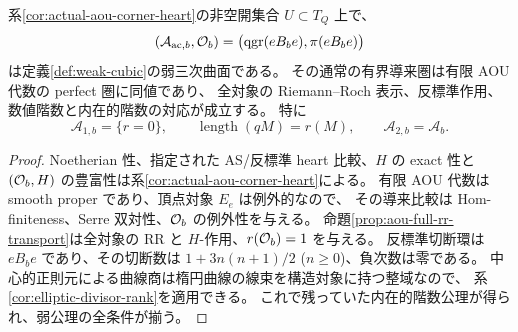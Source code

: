 \begin{corollary}
\label{cor:actual-aou-weak-heart}
系\ref{cor:actual-aou-corner-heart}の非空開集合 $U\subset T_Q$ 上で、
\[
 (\mathcal A_{{\rm ac},b},\mathcal O_b)
 =\bigl(\operatorname{qgr}(eB_be),\pi(eB_be)\bigr)
\]
は定義\ref{def:weak-cubic}の弱三次曲面である。
その通常の有界導来圏は有限 AOU 代数の perfect 圏に同値であり、
全対象の Riemann--Roch 表示、反標準作用、数値階数と内在的階数の対応が成立する。
特に
\[
 \mathcal A_{1,b}=\{r=0\},\qquad
 \operatorname{length}(qM)=r(M),\qquad
 \mathcal A_{2,b}=\mathcal A_b.
\]
\end{corollary}
\begin{proof}
Noetherian 性、指定された AS/反標準 heart 比較、$H$ の exact 性と
$(\mathcal O_b,H)$ の豊富性は系\ref{cor:actual-aou-corner-heart}による。
有限 AOU 代数は smooth proper であり、頂点対象 $E_e$ は例外的なので、
その導来比較は Hom-finiteness、Serre 双対性、$\mathcal O_b$ の例外性を与える。
命題\ref{prop:aou-full-rr-transport}は全対象の RR と $H$-作用、$r(\mathcal O_b)=1$ を与える。
反標準切断環は $eB_be$ であり、その切断数は
$1+3n(n+1)/2$ ($n\ge0$)、負次数は零である。
中心的正則元による曲線商は楕円曲線の線束を構造対象に持つ整域なので、
系\ref{cor:elliptic-divisor-rank}を適用できる。
これで残っていた内在的階数公理が得られ、弱公理の全条件が揃う。
\end{proof}

